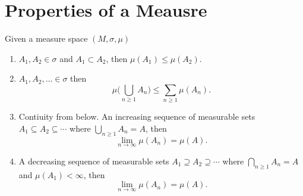 \documentclass[12pt]{article}
\theoremstyle{definition}
\theoremstyle{definition}
\begin{document}
\section{Properties of a Meausre}
    Given a measure space $(M, \sigma, \mu)$
    \begin{enumerate}
        \item $A_1, A_2\in\sigma$ and $A_1\subset A_2$, then $\mu(A_1)\leq\mu(A_2)$.
        \item $A_1, A_2, \dots\in\sigma$ then
            \begin{equation*}
                \mu\bigg(\bigcup_{n\geq 1}A_n\bigg)\leq\sum_{n\geq 1}\mu(A_n).
            \end{equation*}
        \item Contiuity from below. An increasing sequence of measurable sets
            $A_1\subseteq A_2\subseteq\cdots$ where $\bigcup_{n\geq 1}A_n=A$,
            then 
            \begin{equation*}
                \lim_{n\to\infty}\mu(A_n)=\mu(A).
            \end{equation*}
        \item A decreasing sequence of measurable sets $A_1\supseteq
            A_2\supseteq\cdots$ where $\bigcap_{n\geq 1}A_n=A$ and
            $\mu(A_1)<\infty$, then 
            \begin{equation*}
                \lim_{n\to\infty}\mu(A_n)=\mu(A). 
            \end{equation*}
    \end{enumerate}
\end{document}
